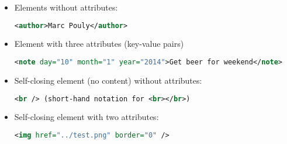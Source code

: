 \begin{itemize}
\item Elements without attributes:
\begin{lstlisting}[language=XML]
<author>Marc Pouly</author>
\end{lstlisting}

\item Element with three attributes (key-value pairs)
\begin{lstlisting}[language=XML]
<note day="10" month="1" year="2014">Get beer for weekend</note>
\end{lstlisting}

\item Self-closing element (no content) without attributes:
\begin{lstlisting}[language=XML]
<br /> (short-hand notation for <br></br>)
\end{lstlisting}

\item Self-closing element with two attributes:
\begin{lstlisting}[language=XML]
<img href="../test.png" border="0" />
\end{lstlisting}


\end{itemize}